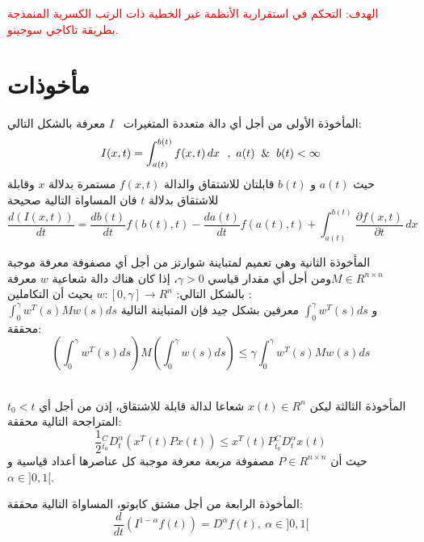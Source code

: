 \documentclass[dvipsnames,mathserif]{beamer}
\begin{document}
{\begin{frame}
\textcolor{red}{الهدف: التحكم في استقرارية الأنظمة غير الخطية ذات الرتب الكسرية المنمذجة بطريقة تاكاجي سوجينو.}
\end{frame}
\section{مأخوذات}
    \begin{frame}
    \footnotesize
       \begin{block}{المأخوذة الأولى}
         من أجل أي دالة متعددة المتغيرات  \ $I$ معرفة بالشكل التالي: 
        \begin{equation*}
           I(x,t)=\int_{a(t)}^{b(t)} f(x,t) \,dx \  \ ,  \ a(t) \And b(t)<\infty
         \end{equation*}
              حيث 
              $a(t)$ و $b(t)$ قابلتان للاشتقاق 
                والدالة 
               $f(x,t)$
                 مستمرة بدلالة $x$ وقابلة للاشتقاق بدلالة  $t$
                 فان المساواة التالية صحيحة
         \begin{equation*}
   \frac{d(I(x,t))}{dt}=\frac{db(t)}{dt}f(b(t),t)-\frac{da(t)}{dt}f(a(t),t)+\int_{a(t)}^{b(t)} \frac{\partial f(x,t)}{\partial t} \,dx  
   \end{equation*}
       \end{block}
\begin{block}{المأخوذة الثانية}
وهي تعميم لمتباينة شوارتز
من أجل أي مصفوفة معرفة موجبة  $M \in R^{n \times n}$ومن أجل أي مقدار قياسي 
$\gamma>0$، إذا كان هناك دالة شعاعية $w$ معرفة بالشكل التالي: $w:[0,\gamma]\to R^n$    بحيث أن التكاملين :\\ $\int_{0}^{\gamma} w^T(s)Mw(s)ds$ و  
$\int_{0}^{\gamma}w^T(s)ds$
معرفين بشكل جيد فإن المتباينة التالية محققة:
\begin{equation*}
\left(\int_{0}^{\gamma}w^T(s)ds\right)M\left(\int_{0}^{\gamma}w(s) ds\right)\leq\gamma\int_{0}^{\gamma} w^T(s)Mw(s)ds 
\end{equation*} \\
   \end{block}
\end{frame}    %

\begin{frame}
\footnotesize
\begin{block}{المأخوذة الثالثة}
 ليكن $x(t)\in R^n$ شعاعا لدالة قابلة للاشتقاق،
إذن من أجل أي $t_0 < t$ المتراجحة التالية محققة:
\begin{equation*}
    \frac{1}{2}{ }_{t_0}^C D_t^\alpha (x^T(t)Px(t))\leq x^T(t)P{ }_{t_0}^C D_t^\alpha x(t) 
\end{equation*}
 حيث أن $P \in R^{n \times n}$ مصفوفة مربعة معرفة موجبة كل عناصرها أعداد قياسية
 و 
 $\alpha \in ]0,1[$.
\end{block}
\begin{block}{المأخوذة الرابعة}
من أجل مشتق كابوتو، المساواة التالية محققة:
\begin{equation*}
  \frac{d}{dt}(I^{1-\alpha}f(t))={D}^{\alpha}f(t),\  \alpha \in ]0,1[ 
\end{equation*}
\end{block}
\end{frame}
}
\end{document}
